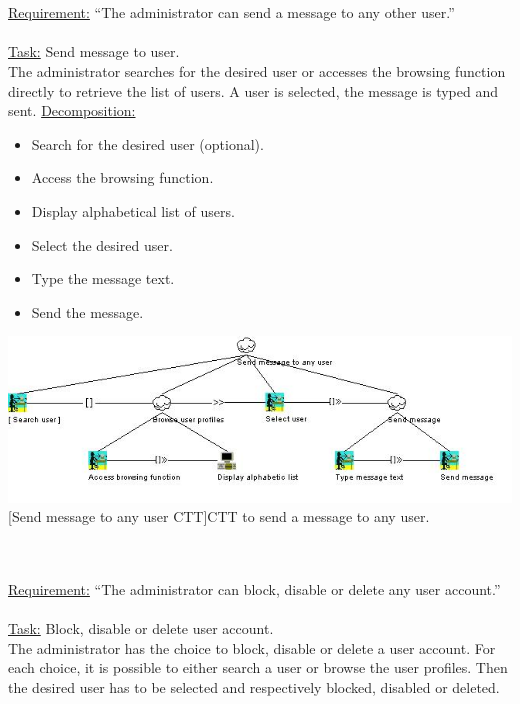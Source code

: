 \documentclass[11pt, a4paper,svglistings,oneside]{book}
\begin{document}
$\;$ \\ \\
\underline{Requirement:} ``The administrator can send a message to any other user.'' \\ \\
\underline{Task:} Send message to user. \\
The administrator searches for the desired user or accesses the browsing function directly to retrieve the list of users. A user is selected, the message is typed and sent.
\underline{Decomposition:}
\begin{itemize}
\item Search for the desired user (optional).
\item Access the browsing function.
\item Display alphabetical list of users.
\item Select the desired user.
\item Type the message text.
\item Send the message.
\end{itemize}
\noindent\begin{minipage}{\textwidth}
    \centering
   \includegraphics[width=\textwidth]{CTT_Admin_Send_Message.png}
 [Send message to any user CTT]{CTT to send a message to any user.}
\end{minipage}
$\;$ \\ \\
\underline{Requirement:} ``The administrator can block, disable or delete any user account.'' \\ \\
\underline{Task:} Block, disable or delete user account. \\
The administrator has the choice to block, disable or delete a user account. For each choice, it is possible to either search a user or browse the user profiles. Then the desired user has to be selected and respectively blocked, disabled or deleted. \\ \\
\end{document}
